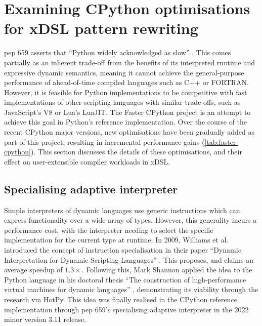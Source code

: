 \chapter{Examining CPython optimisations for xDSL pattern rewriting}
\label{chap:impact-cpython-pattern-rewriting}

\acf{pep} 659 asserts that ``Python widely acknowledged as slow'' \cite{pep659}.
This comes partially as an inherent trade-off from the benefits of its interpreted runtime and expressive dynamic semantics, meaning it cannot achieve the general-purpose performance of ahead-of-time compiled languages such as C++ or FORTRAN. However, it is feasible for Python implementations to be competitive with fast implementations of other scripting languages with similar trade-offs, such as JavaScript's V8 or Lua's LuaJIT. The Faster CPython project is an attempt to achieve this goal in Python's reference implementation. Over the course of the recent CPython major versions, new optimisations have been gradually added as part of this project, resulting in incremental performance gains (\autoref{tab:faster-cpython}).
This section discusses the details of these optimisations, and their effect on user-extensible compiler workloads in xDSL.


\section{Specialising adaptive interpreter}
\label{sec:specialising-adaptive-interpreter}

Simple interpreters of dynamic languages use generic instructions which can express functionality over a wide array of types. However, this generality incurs a performance cost, with the interpreter needing to select the specific implementation for the current type at runtime.
In 2009, Williams et al. introduced the concept of instruction specialisation in their paper ``Dynamic Interpretation for Dynamic Scripting Languages'' \cite{williamsDynamicInterpretationDynamic2010}.
This proposes, and claims an average speedup of $1.3\times$.
Following this, Mark Shannon applied the idea to the Python language in his doctoral thesis ``The construction of high-performance virtual
machines for dynamic languages'' \cite{shannonConstructionHighperformanceVirtual2011}, demonstrating its viability through the research \ac{vm} HotPy.
This idea was finally realised in the CPython reference implementation through \ac{pep} 659's specialising adaptive interpreter in the 2022 minor version 3.11 release.

